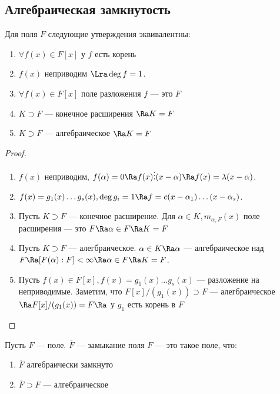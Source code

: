 \subsection{Алгебраическая замкнутость}
\begin{theorem}
    Для поля \(F\) следующие утверждения эквивалентны:
    \begin{enumerate}
        \item \(\forall f(x) \in F[x]\) у \(f\) есть корень
        \item \(f(x)\) неприводим \(\Lra \deg f = 1\).
        \item \(\forall f(x) \in F[x]\) поле разложения \(f\) --- это \(F\)
        \item \(K \supset F\) --- конечное расширения \(\Ra K = F\)
        \item \(K \supset F\) --- алгебраическое \(\Ra K = F\)
    \end{enumerate}
\end{theorem}
\begin{proof}\indent
    \begin{enumerate}
        \item[\((1) \Ra (2)\)] \(f(x)\) неприводим, \(f(\alpha) = 0 \Ra f(x) \vdots (x - \alpha) \Ra f(x) = \lambda (x - \alpha)\).
        \item[\((2) \Ra (3)\)] \(f(x) = g_1(x)\dots g_s(x), \deg g_i = 1 \Ra f = c(x - \alpha_1)\dots (x - \alpha_s)\).
        \item[\((3) \Ra (4)\)] Пусть \(K \supset F\) --- конечное расширение. Для \(\alpha \in K, m_{\alpha, F}(x)\) поле расширения --- это \(F \Ra \alpha \in F \Ra K = F\)
        \item[\((4) \Ra (5)\)] Пусть \(K \supset F\) --- алегбраическое. \(\alpha \in K \Ra \alpha\) --- алгебраическое над \(F \Ra [F(\alpha):F] < \infty \Ra \alpha \in F \Ra K = F\).
        \item[\((5) \Ra (1)\)] Пусть \(f(x) \in F[x], f(x) = g_1(x)\dots g_s(x)\) --- разложение на неприводимые. Заметим, что \(F[x]/(g_1(x)) \supset F\) --- алегбраическое \(\Ra F[x]/(g_1(x)) = F \Ra\) у \(g_1\) есть корень в \(F\)
    \end{enumerate}
\end{proof}

\begin{definition}
    Пусть \(F\) --- поле. \(\overline{F}\) --- замыкание поля \(F\) --- это такое поле, что:
    \begin{enumerate}
        \item \(\overline{F}\) алгебраически замкнуто
        \item \(\overline{F} \supset F\) --- алгебраическое
    \end{enumerate}
\end{definition}

